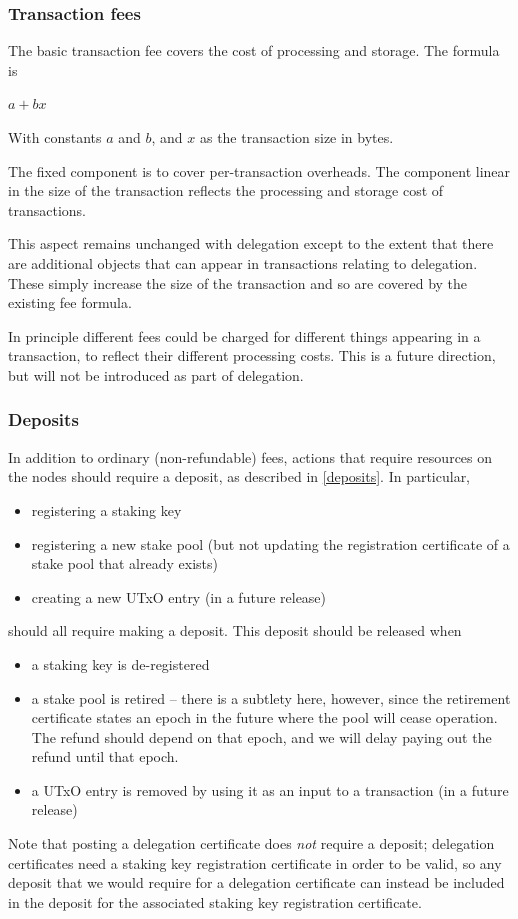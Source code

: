 \documentclass[11pt,a4paper,dvipsnames,twosided]{article}
\begin{document}
\subsubsection{Transaction fees}
\label{transaction-fees}

The basic transaction fee covers the cost of processing and storage. The
formula is

\(a + b x\)

With constants \(a\) and \(b\), and \(x\) as the transaction size in
bytes.

The fixed component is to cover per-transaction overheads. The component
linear in the size of the transaction reflects the processing and
storage cost of transactions.

This aspect remains unchanged with delegation except to the extent that
there are additional objects that can appear in transactions relating to
delegation. These simply increase the size of the transaction and so are
covered by the existing fee formula.

In principle different fees could be charged for different things
appearing in a transaction, to reflect their different processing costs.
This is a future direction, but will not be introduced as part of
delegation.

\subsubsection{Deposits}
\label{fees-deposits}

In addition to ordinary (non-refundable) fees, actions that require
resources on the nodes should require a deposit, as described in
\cref{deposits}. In particular,
\begin{itemize}
\item registering a staking key
\item registering a new stake pool (but not updating the registration
  certificate of a stake pool that already exists)
\item creating a new UTxO entry (in a future release)
\end{itemize}
should all require making a deposit. This deposit should be released
when
\begin{itemize}
\item a staking key is de-registered
\item a stake pool is retired -- there is a subtlety here, however,
  since the retirement certificate states an epoch in the future where
  the pool will cease operation. The refund should depend on that
  epoch, and we will delay paying out the refund until that epoch.
\item a UTxO entry is removed by using it as an input to a transaction (in a
  future release)
\end{itemize}
Note that posting a delegation certificate does \emph{not} require a
deposit; delegation certificates need a staking key registration
certificate in order to be valid, so any deposit that we would require
for a delegation certificate can instead be included in the deposit
for the associated staking key registration certificate.
\end{document}
